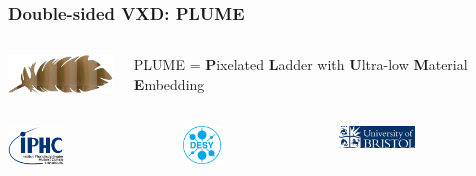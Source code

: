 \documentclass{beamer}
\begin{document}

\begin{frame}
  \frametitle{Double-sided VXD: PLUME}

  \begin{columns}[c]
    \begin{column}{3cm}
      \includegraphics[width = 3cm]{Pictures/logo_plume.png}
    \end{column}
    \vspace{-0.2cm}
    \begin{column}{7cm}
      PLUME = \textbf{P}ixelated \textbf{L}adder with \textbf{U}ltra-low \textbf{M}aterial \textbf{E}mbedding
    \end{column}
  \end{columns}

  \begin{columns}[t]
    \begin{column}{1cm}
      \includegraphics[width = 1.5cm]{Pictures/logo_IPHC_10cm.png}
    \end{column}
    \begin{column}{1cm}
      \includegraphics[width = 1cm]{Pictures/DESY-Logo.png}
    \end{column}
    \begin{column}{1cm}
      \includegraphics[width = 2cm]{Pictures/logo_uni_bristol.jpg}
    \end{column}
  \end{columns}

  \vspace{-0.15cm}


\end{frame}
\end{document}
